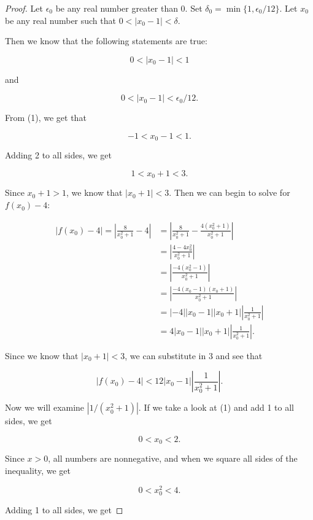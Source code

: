\documentclass[12pt]{article}
\begin{document}
\begin{proof}
    Let $\epsilon_0$ be any real number greater than 0. Set $\delta_0 = \min\{1, \epsilon_0 / 12\}$. Let $x_0$ be any real number such that $0 < |x_0 - 1| < \delta$.

    Then we know that the following statements are true:

    \begin{equation}
        0 < |x_0 - 1| < 1
    \end{equation}

    and

    \begin{equation}
        0 < |x_0 - 1| < \epsilon_0/12.
    \end{equation}      

    From (1), we get that

    $$-1 < x_0 - 1 < 1.$$

    Adding 2 to all sides, we get

    $$1 < x_0 + 1 < 3.$$

    Since $x_0 + 1 > 1$, we know that $|x_0 + 1| < 3$. Then we can begin to solve for $f(x_0) - 4$:

    \begin{align*}
        |f(x_0) - 4| = |\frac{8}{x_0^2 + 1} - 4| & = |\frac{8}{x_0^2 + 1} - \frac{4(x_0^2 + 1)}{x_0^2 + 1}| \\
        & = |\frac{4 - 4x_0^2}{x_0^2 + 1}| \\
        & = |\frac{-4(x_0^2 - 1)}{x_0^2 + 1}| \\
        & = |\frac{-4(x_0 - 1)(x_0 + 1)}{x_0^2 + 1}| \\
        & = |-4||x_0 - 1||x_0 + 1||\frac{1}{x_0^2 + 1}| \\
        & = 4|x_0 - 1||x_0 + 1||\frac{1}{x_0^2 + 1}|.
    \end{align*}

    Since we know that $|x_0 + 1| < 3$, we can substitute in 3 and see that

    $$|f(x_0) - 4| < 12|x_0 - 1||\frac{1}{x_0^2 + 1}|.$$

    Now we will examine $|1/(x_0^2 + 1)|$. If we take a look at (1) and add 1 to all sides, we get

    $$0 < x_0 < 2.$$

    Since $x > 0$, all numbers are nonnegative, and when we square all  sides of the inequality, we get

    $$0 < x_0^2 < 4.$$

    Adding 1 to all sides, we get


\end{proof}
\end{document}
